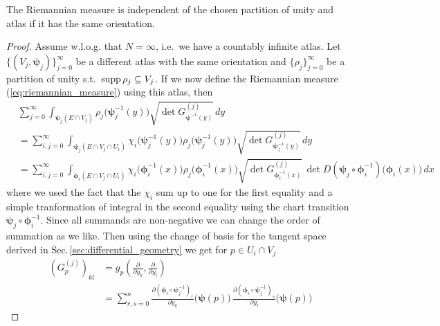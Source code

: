 \documentclass[../master_thesis.tex]{subfiles}
\begin{document}
\begin{proposition}
    The Riemannian measure is independent of the chosen partition of unity and atlas if  
    it has the same orientation.
\end{proposition}
\begin{proof}
    Assume w.l.o.g. that $N=\infty$, i.e.~we have a countably infinite atlas.
    Let $\{(V_j, \boldsymbol{\psi}_j)\}_{j=0}^\infty$ 
    be a different atlas with the same orientation and 
    $\{\rho_j\}_{j=0}^\infty$ be a partition of unity s.t.~$\operatorname{supp} \rho_j \subseteq V_j$. If we now 
    define the Riemannian measure (\ref{eq:riemannian_measure}) using this atlas, then
    \begin{align}
        &\sum_{j=0}^\infty \int_{\boldsymbol{\psi}_j(E\cap V_j)} \rho_j\big(\boldsymbol{\psi}_j^{-1}(y)\big)
            \sqrt{\det G^{(j)}_{\boldsymbol{\psi}^{-1}(y)}} \, dy \nonumber
        \\ &= \sum_{i,j=0}^\infty \int_{\boldsymbol{\psi}_j(E\cap V_j \cap U_i)} \chi_i\big(\boldsymbol{\psi}_j^{-1}(y)\big)
            \rho_j\big(\boldsymbol{\psi}_j^{-1}(y)\big)
            \sqrt{\det G^{(j)}_{\boldsymbol{\psi}_j^{-1}(y)}} \, dy \nonumber
        \\ &= \sum_{i,j=0}^\infty \int_{\boldsymbol{\phi}_i(E\cap V_j \cap U_i)} \chi_i\big(\boldsymbol{\phi}_i^{-1}(x)\big) 
            \rho_j\big(\boldsymbol{\phi}_i^{-1}(x)\big)
            \sqrt{\det G^{(j)}_{\boldsymbol{\phi}_i^{-1}(x)}} \, \det D(\boldsymbol{\psi}_j 
            \circ \boldsymbol{\phi}^{-1}_i)\big(\boldsymbol{\phi}_i(x)\big) \, dx \label{eq:double_sum_riemannian_measure}
    \end{align}
    where we used the fact that the $\chi_i$ sum up to one for the first 
    equality and a simple tranformation of integral in the second equality
    using the chart transition $\boldsymbol{\psi}_j\circ \boldsymbol{\phi}_i^{-1}$. Since all summands 
    are non-negative we can change the order of summation as we like. Then using the 
    change of basis for the tangent space derived in Sec.\,\ref{sec:differential_geometry}
    we get for $p \in U_i \cap V_j$
    \begin{align*}
        (G^{(j)}_p)_{kl} &= g_p(\frac{\partial}{\partial y_k}, \frac{\partial}{\partial y_l})
        \\ &= \sum_{r,s=0}^n \frac{\partial(\boldsymbol{\phi}_i 
            \circ \boldsymbol{\psi}_j^{-1})_r}{\partial y_k}\big(\boldsymbol{\psi}(p)\big)
            \, \frac{\partial(\boldsymbol{\phi}_i 
            \circ \boldsymbol{\psi}_j^{-1})_s}{\partial y_l}\big(\boldsymbol{\psi}(p)\big)

\end{align*}
\end{proof}
\end{document}
